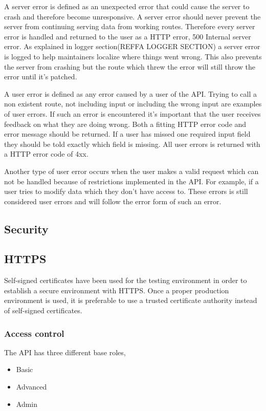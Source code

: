 A server error is defined as an unexpected error that could cause the server to crash and therefore become unresponsive. A server error should never prevent the server from continuing serving data from working routes. Therefore every server error is handled and returned to the user as a HTTP error, 500 Internal server error. As explained in logger section(REFFA LOGGER SECTION) a server error is logged to help maintainers localize where things went wrong. This also prevents the server from crashing but the route which threw the error will still throw the error until it's patched. 

A user error is defined as any error caused by a user of the API. Trying to call a non existent route, not including input or including the wrong input are examples of user errors. If such an error is encountered it's important that the user receives feedback on what they are doing wrong. Both a fitting HTTP error code and error message should be returned. If a user has missed one required input field they should be told exactly which field is missing. All user errors is returned with a HTTP error code of 4xx.

Another type of user error occurs when the user makes a valid request which can not be handled because of restrictions implemented in the API. For example, if a user tries to modify data which they don't have access to. These errors is still considered user errors and will follow the error form of such an error.

\subsection{Security}

\subsection{HTTPS} \label{https}
Self-signed certificates have been used for the testing environment in order to establish a secure environment with HTTPS. Once a proper production environment is used, it is preferable to use a trusted certificate authority instead of self-signed certificates.

\subsubsection{Access control}
The API has three different base roles, 
\begin{itemize}
\item Basic
\item Advanced
\item Admin
\end{itemize}


